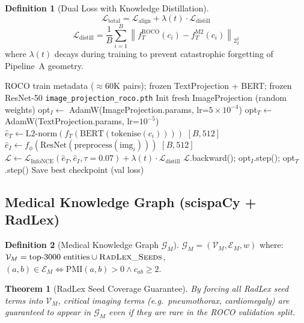 \documentclass[12pt,a4paper]{article}
\theoremstyle{definition}
\newtheorem{definition}{Definition}[section]
\theoremstyle{plain}
\newtheorem{theorem}{Theorem}[section]
\theoremstyle{remark}
\newcommand{\Norm}[1]{\left\|#1\right\|_2}
\newcommand{\KG}{\mathcal{G}}
\begin{document}
\begin{definition}[Dual Loss with Knowledge Distillation]
\[
  \mathcal{L}_{\text{total}} = \mathcal{L}_{\text{align}} + \lambda(t) \cdot \mathcal{L}_{\text{distill}}
\]
\[
  \mathcal{L}_{\text{distill}} = \frac{1}{B}\sum_{i=1}^B \Norm{f_T^{\text{ROCO}}(c_i) - f_T^{\text{M2}}(c_i)}_2^2
\]
where $\lambda(t)$ decays during training to prevent catastrophic forgetting of Pipeline~A geometry.
\end{definition}

\begin{algorithm}[H]
\caption{Fine-tune ImageProjection for ROCO Medical Domain}
\label{alg:finetune_roco}
\begin{algorithmic}[1]
\Require ROCO train metadata ($\approx$60K pairs); frozen TextProjection + BERT; frozen ResNet-50
\Ensure \texttt{image\_projection\_roco.pth}
\State Init fresh ImageProjection (random weights)
\State opt$_I \gets$ AdamW(ImageProjection.params, lr=$5\times10^{-4}$)
\State opt$_T \gets$ AdamW(TextProjection.params, lr=$10^{-5}$) 
    \State $\hat{e}_T \gets \text{L2-norm}(f_T(\text{BERT}(\text{tokenise}(c_i))))$ \quad $[B,512]$
    \State $\hat{e}_I \gets f_\phi(\text{ResNet}(\text{preprocess}(\text{img}_i)))$ \quad $[B,512]$
    \State $\mathcal{L} \gets \mathcal{L}_{\text{InfoNCE}}(\hat{e}_T, \hat{e}_I, \tau{=}0.07) + \lambda(t)\cdot\mathcal{L}_{\text{distill}}$
    \State $\mathcal{L}$.backward(); opt$_I$.step(); opt$_T$.step()
  \EndFor
  \State Save best checkpoint (val loss)
\EndFor
\end{algorithmic}
\end{algorithm}

\subsection{Medical Knowledge Graph (scispaCy + RadLex)}

\begin{definition}[Medical Knowledge Graph $\KG_M$]
$\KG_M = (\mathcal{V}_M, \mathcal{E}_M, w)$ where:
$\mathcal{V}_M = \text{top-3000 entities} \cup \textsc{RadLex\_Seeds}$, $(a,b) \in \mathcal{E}_M \Leftrightarrow \text{PMI}(a,b) > 0 \wedge c_{ab} \ge 2$.
\end{definition}

\begin{theorem}[RadLex Seed Coverage Guarantee]
By forcing all RadLex seed terms into $\mathcal{V}_M$, critical imaging terms (e.g.\ \emph{pneumothorax}, \emph{cardiomegaly}) are guaranteed to appear in $\KG_M$ even if they are rare in the ROCO validation split.
\end{theorem}
\end{document}
